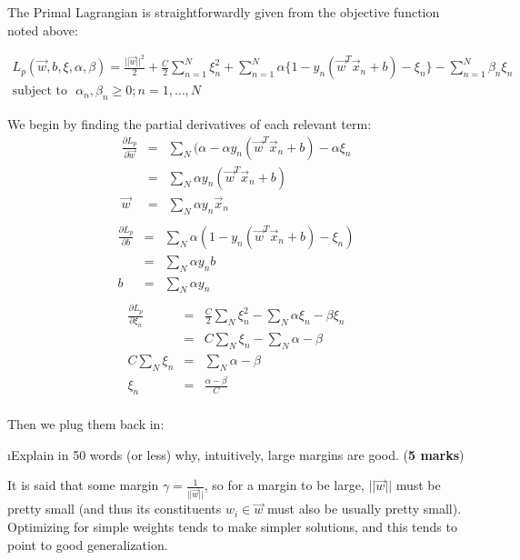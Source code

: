 \documentclass[fleqn]{article}
\begin{document}
\begin{solution}
The Primal Lagrangian is straightforwardly given from the objective function noted above:

\begin{gather*}
L_p(\vec{w}, b, \xi, \alpha, \beta) = \frac{||\vec{w}||^2}{2} + \frac{C}{2} \sum_{n=1}^N \xi_n^2 + \sum_{n=1}^N \alpha\{1-y_n(\vec{w}^T \vec{x}_n + b) - \xi_n\} - \sum_{n=1}^N \beta_n \xi_n \\
\text{subject to}\ \ \ \alpha_n, \beta_n \ge 0; n  = 1, \ldots, N
\end{gather*}

We begin by finding the partial derivatives of each relevant term:
\begin{eqnarray*}
\frac{\partial L_p}{\partial \vec{w}} & = & \sum_N (\alpha - \alpha y_n(\vec{w}^T \vec{x}_n + b) - \alpha \xi_n \\
& = & \sum_N \alpha y_n(\vec{w}^T \vec{x}_n + b) \\
\vec{w} & = & \sum_N \alpha y_n \vec{x}_n \\
\end{eqnarray*}
\begin{eqnarray*}
\frac{\partial L_p}{\partial b} & = & \sum_N \alpha(1-y_n(\vec{w}^T \vec{x}_n + b) - \xi_n) \\
& = & \sum_N \alpha y_n b \\
b & = & \sum_N \alpha y_n \\
\end{eqnarray*}
\begin{eqnarray*}
\frac{\partial L_p}{\partial \xi_n} & = & \frac{C}{2} \sum_N \xi_n^2 - \sum_N \alpha \xi_n - \beta \xi_n \\
& = & C \sum_N \xi_n - \sum_N \alpha - \beta \\
C \sum_N \xi_n & = & \sum_N \alpha - \beta \\
\xi_n & = & \frac{\alpha - \beta}{C} \\
\end{eqnarray*}

Then we plug them back in:

\end{solution}

\i Explain in 50 words (or less) why, intuitively, large margins are good. (\textbf{5 marks})

\begin{solution}
It is said that some margin $\gamma = \frac{1}{||\vec{w}||}$, so for a margin to be large, $||\vec{w}||$ must be pretty small (and thus its constituents $w_i \in \vec{w}$ must also be usually pretty small). Optimizing for simple weights tends to make simpler solutions, and this tends to point to good generalization.
\end{solution}
\end{document}
